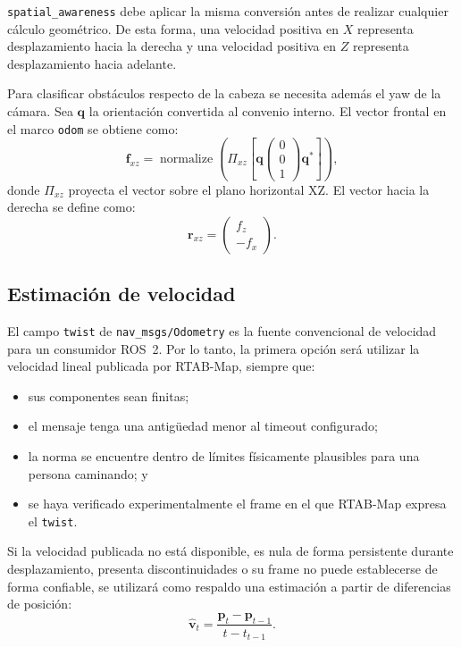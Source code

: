 \texttt{spatial\_awareness} debe aplicar la misma conversión antes de realizar
cualquier cálculo geométrico. De esta forma, una velocidad positiva en $X$
representa desplazamiento hacia la derecha y una velocidad positiva en $Z$
representa desplazamiento hacia adelante.

Para clasificar obstáculos respecto de la cabeza se necesita además el yaw de
la cámara. Sea $\mathbf{q}$ la orientación convertida al convenio interno. El
vector frontal en el marco \texttt{odom} se obtiene como:
%
\begin{equation}
  \label{eq:sa-forward}
  \mathbf{f}_{xz}
  =
  \operatorname{normalize}
  \left(
    \Pi_{xz}
    \left[
      \mathbf{q}
      \begin{pmatrix}0\\0\\1\end{pmatrix}
      \mathbf{q}^{*}
    \right]
  \right),
\end{equation}
%
donde $\Pi_{xz}$ proyecta el vector sobre el plano horizontal XZ. El vector
hacia la derecha se define como:
%
\begin{equation}
  \label{eq:sa-right}
  \mathbf{r}_{xz} =
  \begin{pmatrix}f_z\\-f_x\end{pmatrix}.
\end{equation}

\subsection{Estimación de velocidad}
\label{subsec:sa-velocity}

El campo \texttt{twist} de \texttt{nav\_msgs/Odometry} es la fuente
convencional de velocidad para un consumidor ROS~2. Por lo tanto, la primera
opción será utilizar la velocidad lineal publicada por RTAB-Map, siempre que:
%
\begin{itemize}
  \item sus componentes sean finitas;
  \item el mensaje tenga una antigüedad menor al timeout configurado;
  \item la norma se encuentre dentro de límites físicamente plausibles para
    una persona caminando; y
  \item se haya verificado experimentalmente el frame en el que RTAB-Map
    expresa el \texttt{twist}.
\end{itemize}

Si la velocidad publicada no está disponible, es nula de forma persistente
durante desplazamiento, presenta discontinuidades o su frame no puede
establecerse de forma confiable, se utilizará como respaldo una estimación a
partir de diferencias de posición:
%
\begin{equation}
  \label{eq:sa-velocity-raw}
  \widehat{\mathbf{v}}_t =
  \frac{\mathbf{p}_t-\mathbf{p}_{t-1}}{t-t_{t-1}}.
\end{equation}

